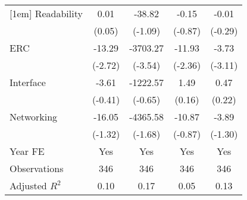 {\begin{tabular}{l*{4}{c}}
[1em]
Readability                        &        0.01         &      -38.82         &       -0.15         &       -0.01         \\
                                   &      (0.05)         &     (-1.09)         &     (-0.87)         &     (-0.29)         \\
[1em]
ERC                                &      -13.29\sym{***}&    -3703.27\sym{***}&      -11.93\sym{**} &       -3.73\sym{***}\\
                                   &     (-2.72)         &     (-3.54)         &     (-2.36)         &     (-3.11)         \\
[1em]
Interface                          &       -3.61         &    -1222.57         &        1.49         &        0.47         \\
                                   &     (-0.41)         &     (-0.65)         &      (0.16)         &      (0.22)         \\
[1em]
Networking                         &      -16.05         &    -4365.58\sym{*}  &      -10.87         &       -3.89         \\
                                   &     (-1.32)         &     (-1.68)         &     (-0.87)         &     (-1.30)         \\
[1em]
Year FE                            &         Yes         &         Yes         &         Yes         &         Yes         \\
\hline
Observations                       &         346         &         346         &         346         &         346         \\
Adjusted \(R^{2}\)                 &        0.10         &        0.17         &        0.05         &        0.13         \\
\hline\hline
\end{tabular}
}
